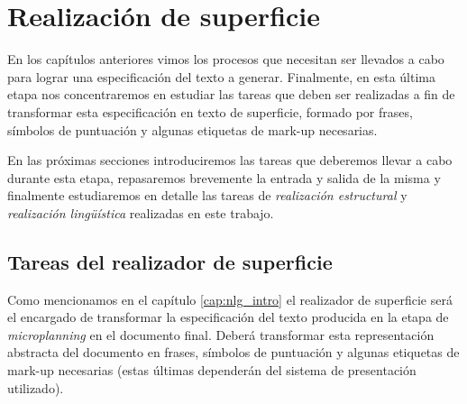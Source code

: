 \chapter{Realización de superficie}
\label{cap:realization}
En los capítulos anteriores vimos los procesos que necesitan ser llevados a cabo para lograr una especificación del texto a generar. Finalmente, en esta última etapa nos concentraremos en estudiar las tareas que deben ser realizadas a fin de transformar esta especificación en texto de superficie, formado por frases, símbolos de puntuación y algunas etiquetas de mark-up necesarias.

En las próximas secciones introduciremos las tareas que deberemos llevar a cabo durante esta etapa, repasaremos brevemente la entrada y salida de la misma y finalmente estudiaremos en detalle las tareas de \emph{realización estructural} y \emph{realización lingüística} realizadas en este trabajo.


\section{Tareas del realizador de superficie}

Como mencionamos en el capítulo \ref{cap:nlg_intro} el realizador de superficie será el encargado de transformar la especificación del texto producida en la etapa de \textit{microplanning} en el documento final. Deberá transformar esta representación abstracta del documento en frases, símbolos de puntuación y algunas etiquetas de mark-up necesarias (estas últimas dependerán del sistema de presentación utilizado).

